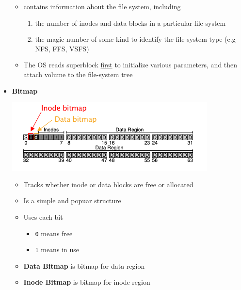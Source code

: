 \documentclass[12pt]{article}
\begin{document}
\begin{itemize}
    \begin{itemize}
        \item contains information about the file system, including

        \begin{enumerate}[1.]
            \item the number of inodes and data blocks in a particular file system
            \item the magic number of some kind to identify the file system type (e.g NFS, FFS, VSFS)
        \end{enumerate}

        \item The OS reads superblock \underline{first} to initialize various parameters,
        and then attach volume to the file-system tree
    \end{itemize}

    \item \textbf{Bitmap}

    \begin{center}
    \includegraphics[width=\linewidth]{images/midterm_1_solution_10.png}
    \end{center}

    \begin{itemize}
        \item Tracks whether inode or data blocks are free or allocated
        \item Is a simple and popuar structure
        \item Uses each bit
        \begin{itemize}
            \item \texttt{0} means free
            \item \texttt{1} means in use
        \end{itemize}

        \item \textbf{Data Bitmap} is bitmap for data region
        \item \textbf{Inode Bitmap} is bitmap for inode region
    \end{itemize}


\end{itemize}
\end{document}
